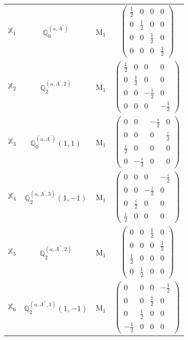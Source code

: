 \documentclass[fleqn,10pt,landscape]{article}
\begin{document}
\begin{itemize}
\begin{center}
\begin{longtable}{c|c|c|c}
$ \mathbb{X}_{1} $ & $\mathbb{Q}_{0}^{(a,A^{\prime})}$ & M$_{1}$ & $\begin{pmatrix} \frac{1}{2} & 0 & 0 & 0 \\ 0 & \frac{1}{2} & 0 & 0 \\ 0 & 0 & \frac{1}{2} & 0 \\ 0 & 0 & 0 & \frac{1}{2} \end{pmatrix}$ \\
$ \mathbb{X}_{2} $ & $\mathbb{Q}_{2}^{(a,A^{\prime},2)}$ & M$_{1}$ & $\begin{pmatrix} \frac{1}{2} & 0 & 0 & 0 \\ 0 & \frac{1}{2} & 0 & 0 \\ 0 & 0 & - \frac{1}{2} & 0 \\ 0 & 0 & 0 & - \frac{1}{2} \end{pmatrix}$ \\
$ \mathbb{X}_{3} $ & $\mathbb{Q}_{0}^{(a,A^{\prime})}(1,1)$ & M$_{1}$ & $\begin{pmatrix} 0 & 0 & - \frac{i}{2} & 0 \\ 0 & 0 & 0 & \frac{i}{2} \\ \frac{i}{2} & 0 & 0 & 0 \\ 0 & - \frac{i}{2} & 0 & 0 \end{pmatrix}$ \\
$ \mathbb{X}_{4} $ & $\mathbb{Q}_{2}^{(a,A^{\prime},3)}(1,-1)$ & M$_{1}$ & $\begin{pmatrix} 0 & 0 & 0 & - \frac{i}{2} \\ 0 & 0 & - \frac{i}{2} & 0 \\ 0 & \frac{i}{2} & 0 & 0 \\ \frac{i}{2} & 0 & 0 & 0 \end{pmatrix}$ \\
$ \mathbb{X}_{5} $ & $\mathbb{Q}_{2}^{(a,A^{\prime\prime},2)}$ & M$_{1}$ & $\begin{pmatrix} 0 & 0 & \frac{1}{2} & 0 \\ 0 & 0 & 0 & \frac{1}{2} \\ \frac{1}{2} & 0 & 0 & 0 \\ 0 & \frac{1}{2} & 0 & 0 \end{pmatrix}$ \\
$ \mathbb{X}_{6} $ & $\mathbb{Q}_{2}^{(a,A^{\prime\prime},1)}(1,-1)$ & M$_{1}$ & $\begin{pmatrix} 0 & 0 & 0 & - \frac{1}{2} \\ 0 & 0 & \frac{1}{2} & 0 \\ 0 & \frac{1}{2} & 0 & 0 \\ - \frac{1}{2} & 0 & 0 & 0 \end{pmatrix}$ \\

\end{longtable}
\end{center}
\end{itemize}
\end{document}
